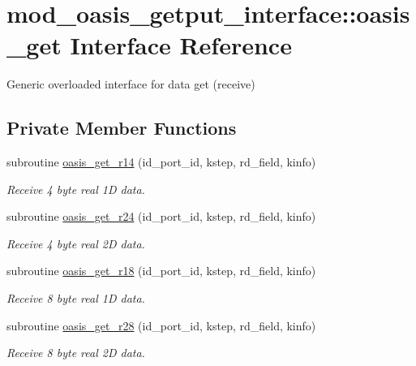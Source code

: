 \hypertarget{interfacemod__oasis__getput__interface_1_1oasis__get}{\section{mod\+\_\+oasis\+\_\+getput\+\_\+interface\+:\+:oasis\+\_\+get Interface Reference}
\label{interfacemod__oasis__getput__interface_1_1oasis__get}
}


Generic overloaded interface for data get (receive)  


\subsection*{Private Member Functions}
\begin{DoxyCompactItemize}
\item 
subroutine \hyperlink{interfacemod__oasis__getput__interface_1_1oasis__get_aad26588d1f8300bc3c889dd4019fc097}{oasis\+\_\+get\+\_\+r14} (id\+\_\+port\+\_\+id, kstep, rd\+\_\+field, kinfo)
\begin{DoxyCompactList}\small\item\em Receive 4 byte real 1\+D data. \end{DoxyCompactList}\item 
subroutine \hyperlink{interfacemod__oasis__getput__interface_1_1oasis__get_a79c49d1b198c96fe244805aff79a0de7}{oasis\+\_\+get\+\_\+r24} (id\+\_\+port\+\_\+id, kstep, rd\+\_\+field, kinfo)
\begin{DoxyCompactList}\small\item\em Receive 4 byte real 2\+D data. \end{DoxyCompactList}\item 
subroutine \hyperlink{interfacemod__oasis__getput__interface_1_1oasis__get_ac708f07a3f46dabaf18a25287346dd0a}{oasis\+\_\+get\+\_\+r18} (id\+\_\+port\+\_\+id, kstep, rd\+\_\+field, kinfo)
\begin{DoxyCompactList}\small\item\em Receive 8 byte real 1\+D data. \end{DoxyCompactList}\item 
subroutine \hyperlink{interfacemod__oasis__getput__interface_1_1oasis__get_ab338ae58eca2351aa5d8f06c160c1215}{oasis\+\_\+get\+\_\+r28} (id\+\_\+port\+\_\+id, kstep, rd\+\_\+field, kinfo)
\begin{DoxyCompactList}\small\item\em Receive 8 byte real 2\+D data. \end{DoxyCompactList}\end{DoxyCompactItemize}


